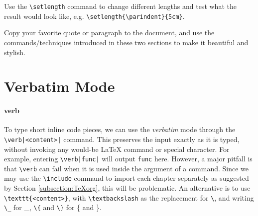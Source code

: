 \begin{exercisebox}
\begin{Exercise}
Use the \texttt{\textbackslash setlength} command to change different lengths and test what the result would look like, e.g. \texttt{\textbackslash setlength\{\textbackslash parindent\}\{5cm\}}.
\end{Exercise}
\begin{Exercise}
Copy your favorite quote or paragraph to the document, and use the commands/techniques introduced in these two sections to make it beautiful and stylish.    
\end{Exercise}
\end{exercisebox}

\section{Verbatim Mode}

\paragraph{verb}
To type short inline code pieces, we can use the \textit{verbatim} mode through the \texttt{\textbackslash verb|<content>|} command. This preserves the input exactly as it is typed, without invoking any would-be \LaTeX{} command or special character. For example, entering \texttt{\textbackslash verb|func|} will output \verb|func| here. However, a major pitfall is that \texttt{\textbackslash verb} can fail when it is used inside the argument of a command. Since we may use the \texttt{\textbackslash include} command to import each chapter separately as suggested by Section \ref{subsection:TeXorg}, this will be problematic. An alternative is to use \texttt{\textbackslash texttt\{<content>\}}, with \texttt{\textbackslash textbackslash} as the replacement for \texttt{\textbackslash}, and writing \texttt{\textbackslash \_} for \_, \texttt{\textbackslash \{} and \texttt{\textbackslash \}} for \{ and \}. 

